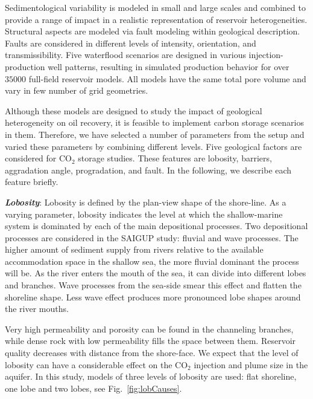 Sedimentological variability is modeled in small and large scales and combined to provide a range of impact in a realistic representation of reservoir heterogeneities. Structural aspects are modeled via fault modeling within geological description. Faults are considered in different levels of intensity, orientation, and transmissibility. Five waterflood scenarios are designed in various injection-production well patterns, resulting in simulated production behavior for over $35000$ full-field reservoir models. All models have the same total pore volume and vary in few number of grid geometries. 

Although these models are designed to study the impact of geological heterogeneity on oil recovery, it is feasible to implement carbon storage scenarios in them. Therefore, we have selected a number of parameters from the setup and varied these parameters by combining different levels. Five geological factors are considered for $\mbox{CO}_2$ storage studies. These features are lobosity, barriers, aggradation angle, progradation, and fault. In the following, we describe each feature briefly.


\textbf{\textit{Lobosity}}: Lobosity is defined by the plan-view shape of the shore-line. As a varying parameter, lobosity indicates the level at which the shallow-marine system is dominated by each of
the main depositional processes. Two depositional processes are considered in the SAIGUP study: fluvial and wave processes. The higher amount of sediment supply from rivers relative to the available accommodation space in the shallow sea, the more fluvial dominant the process will be. As the river enters the mouth of the sea, it can divide into different lobes and branches. Wave processes from the sea-side smear this effect and flatten the shoreline shape. Less wave effect produces more pronounced lobe shapes around the river mouths. 

Very high permeability and porosity can be found in the channeling branches, while dense rock with low permeability fills the space between them. Reservoir quality decreases with distance from the shore-face. We expect that the level of lobosity can have a considerable effect on the CO$_2$ injection and plume size in the aquifer. In this study, models of three levels of lobosity are used: flat shoreline, one lobe and two lobes, see Fig.~\ref{fig:lobCauses}.


